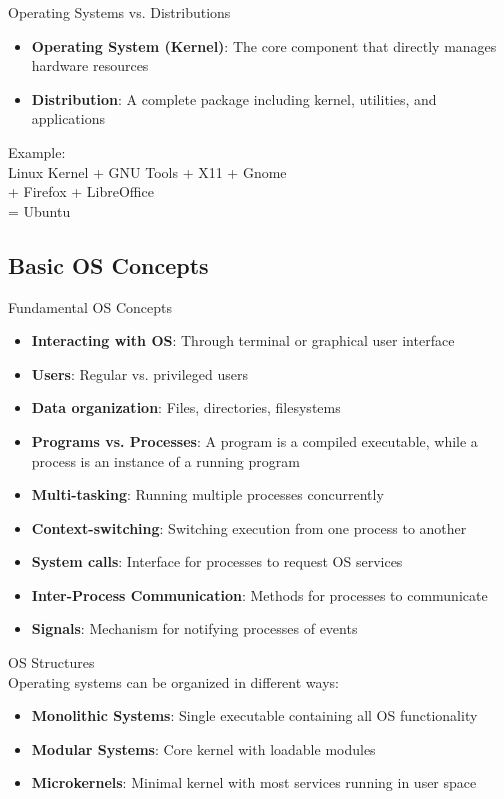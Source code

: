 \begin{corollary}{Operating Systems vs. Distributions}
    \begin{itemize}
        \item \textbf{Operating System (Kernel)}: The core component that directly manages hardware resources
        \item \textbf{Distribution}: A complete package including kernel, utilities, and applications
    \end{itemize}
    Example: \\Linux Kernel + GNU Tools + X11 + Gnome \\ + Firefox + LibreOffice \\ = Ubuntu
\end{corollary}

\multend

\subsection{Basic OS Concepts}

\begin{definition}{Fundamental OS Concepts}
    \begin{itemize}
        \item \textbf{Interacting with OS}: Through terminal or graphical user interface
        \item \textbf{Users}: Regular vs. privileged users
        \item \textbf{Data organization}: Files, directories, filesystems
        \item \textbf{Programs vs. Processes}: A program is a compiled executable, while a process is an instance of a running program
        \item \textbf{Multi-tasking}: Running multiple processes concurrently
        \item \textbf{Context-switching}: Switching execution from one process to another
        \item \textbf{System calls}: Interface for processes to request OS services
        \item \textbf{Inter-Process Communication}: Methods for processes to communicate
        \item \textbf{Signals}: Mechanism for notifying processes of events
    \end{itemize}
\end{definition}

\begin{definition}{OS Structures}\\
    Operating systems can be organized in different ways:
    \begin{itemize}
        \item \textbf{Monolithic Systems}: Single executable containing all OS functionality
        \item \textbf{Modular Systems}: Core kernel with loadable modules
        \item \textbf{Microkernels}: Minimal kernel with most services running in user space
    \end{itemize}
\end{definition}

